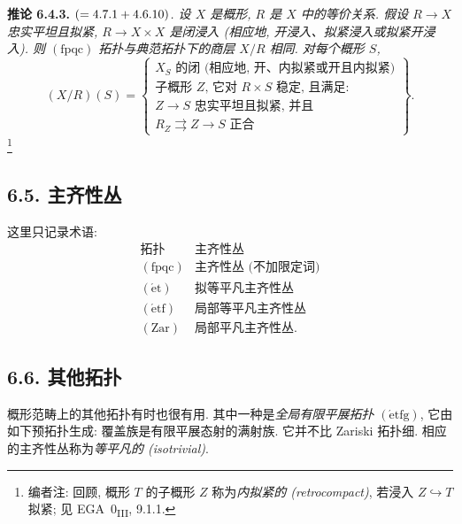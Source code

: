 \medskip
\noindent{}\textbf{推论 6.4.3.}
\textit{\((=\SGARefLink{sga3:iv:proposition:4:7:1}{4.7.1}+\SGARefLink{sga3:iv:corollary:4:6:10}{4.6.10})\).
设 \(X\) 是概形, \(R\) 是 \(X\) 中的等价关系.
假设 \(R\to X\) 忠实平坦且拟紧,
\(R\to X\times X\) 是闭浸入 (相应地, 开浸入、拟紧浸入或拟紧开浸入).
则 \((\mathrm{fpqc})\) 拓扑与典范拓扑下的商层 \(X/R\) 相同.
对每个概形 \(S\),}
\[
(X/R)(S)=
\left\{
\begin{array}{l}
\text{\(X_S\) 的闭 (相应地, 开、内拟紧或开且内拟紧)}
\\
\text{子概形 \(Z\), 它对 \(R\times S\) 稳定, 且满足:}
\\
\text{\(Z\to S\) 忠实平坦且拟紧, 并且}
\\
\text{\(R_Z\rightrightarrows Z\to S\) 正合}
\end{array}
\right\}.
\tag{6.4.3.1}\label{sga3:iv:corollary:6:4:3:eq:6:4:3:1:01}
\]
\footnote{编者注: 回顾, 概形 \(T\) 的子概形 \(Z\)
称为\emph{内拟紧的 (retrocompact)}, 若浸入 \(Z\hookrightarrow T\)
拟紧; 见 EGA~0\textsubscript{III}, 9.1.1.}

\subsection*{6.5. 主齐性丛}

这里只记录术语:
\[
\begin{array}{c|l}
 \text{拓扑}&\text{主齐性丛}\\ \hline
 (\mathrm{fpqc})&\text{主齐性丛 (不加限定词)}
 \\
 (\mathrm{\acute et})&\text{拟等平凡主齐性丛}
 \\
 (\mathrm{\acute etf})&\text{局部等平凡主齐性丛}
 \\
 (\mathrm{Zar})&\text{局部平凡主齐性丛}.
\end{array}
\tag{6.5.1}\label{sga3:iv:subsection:6:5:eq:6:5:1:01}
\]

\subsection*{6.6. 其他拓扑}

概形范畴上的其他拓扑有时也很有用. 其中一种是\emph{全局有限平展拓扑}
\((\mathrm{\acute etfg})\), 它由如下预拓扑生成:
覆盖族是有限平展态射的满射族. 它并不比 Zariski 拓扑细.
相应的主齐性丛称为\emph{等平凡的 (isotrivial)}.

